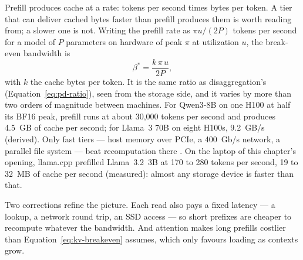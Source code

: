 

Prefill produces cache at a rate: tokens per second times bytes per token. A
tier that can deliver cached bytes faster than prefill produces them is worth
reading from; a slower one is not. Writing the prefill rate as $\pi u/(2P)$
tokens per second for a model of $P$ parameters on hardware of peak $\pi$ at
utilization $u$, the break-even bandwidth is
\begin{equation}
\beta^{*} = \frac{k\,\pi\,u}{2P},
\label{eq:kv-breakeven}
\end{equation}
with $k$ the cache bytes per token. It is the same ratio as disaggregation's
(Equation~\ref{eq:pd-ratio}), seen from the storage side, and it varies by more
than two orders of magnitude between machines. For Qwen3-8B on one H100 at half
its BF16 peak, prefill runs at about 30,000 tokens per second and produces
4.5~GB of cache per second; for Llama~3 70B on eight H100s, 9.2~GB/s (derived).
Only fast tiers --- host memory over PCIe, a 400~Gb/s network, a parallel file
system --- beat recomputation there . On the laptop of this chapter's opening,
llama.cpp prefilled Llama~3.2~3B at 170 to 280 tokens per second, 19 to 32~MB
of cache per second (measured): almost any storage device is faster than
that.

Two corrections refine the picture. Each read also pays a fixed latency ---
a lookup, a network round trip, an SSD access --- so short prefixes are
cheaper to recompute whatever the bandwidth. And attention makes long prefills
costlier than Equation~\ref{eq:kv-breakeven} assumes, which only favours
loading as contexts grow.

